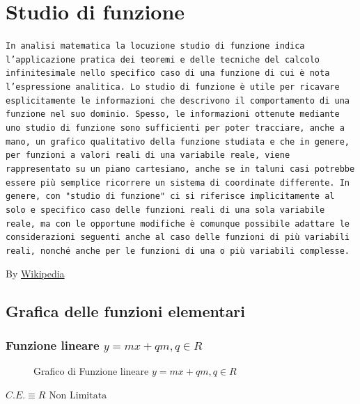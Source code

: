 \chapter{Studio di funzione}
\texttt{In analisi matematica la locuzione studio di funzione indica 
	l'applicazione pratica dei teoremi e delle tecniche del calcolo 
	infinitesimale nello specifico caso di una funzione di cui è nota 
	l'espressione analitica. Lo studio di funzione è utile per ricavare 
	esplicitamente le informazioni che descrivono il comportamento di una 
	funzione nel suo dominio. Spesso, le informazioni ottenute mediante uno 
	studio di funzione sono sufficienti per poter tracciare, anche a mano, un 
	grafico qualitativo della funzione studiata e che in genere, per funzioni a 
	valori reali di una variabile reale, viene rappresentato su un piano 
	cartesiano, anche se in taluni casi potrebbe essere più semplice ricorrere 
	un sistema di coordinate differente. In genere, con "studio di funzione" ci 
	si riferisce implicitamente al solo e specifico caso delle funzioni reali di
	una sola variabile reale, ma con le opportune modifiche è comunque possibile 
	adattare le considerazioni seguenti anche al caso delle funzioni di più
	variabili reali, nonché anche per le funzioni di una o più variabili 
	complesse.}
\begin{center}
	By \href{https://it.wikipedia.org/wiki/Studio_di_funzione}{Wikipedia}
\end{center}

\section{Grafica delle funzioni elementari}
\subsection{Funzione lineare $y=mx+qm, q\in R$}
\begin{figure}[!ht]
	\centering
	\caption{Grafico di Funzione lineare $y=mx+qm, q\in R$}
\end{figure}
$C.E. \equiv R\text{ Non Limitata}$

